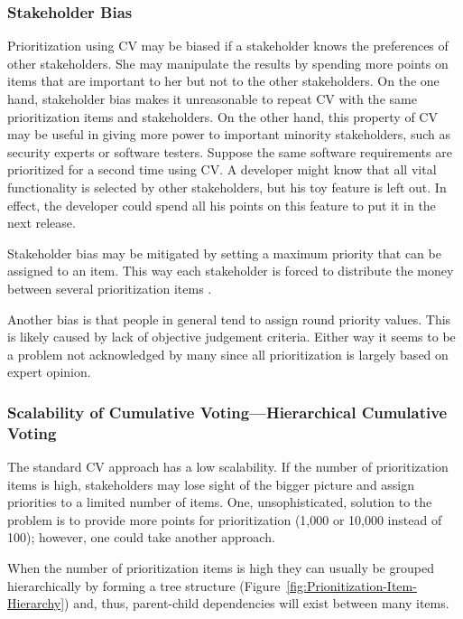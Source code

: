 \subsubsection{Stakeholder Bias\label{sub:Stakeholder-Bias}}

Prioritization using CV may be biased if a stakeholder knows the preferences
of other stakeholders. She may manipulate the results by spending more
points on items that are important to her but not to the other stakeholders.
On the one hand, stakeholder bias makes it unreasonable to repeat CV
with the same prioritization items and stakeholders. On the other hand,
this property of CV may be useful in giving more power to important
minority stakeholders, such as security experts or software testers.
Suppose the same software requirements are prioritized for a second time using
CV. A developer might know that all vital functionality is selected by
other stakeholders, but his toy feature is left out. In effect, the developer
could spend all his points on this feature to put it in the next release. 

Stakeholder bias may be mitigated by setting a maximum priority that
can be assigned to an item. This way each stakeholder is forced to
distribute the money between several prioritization items \cite{Berander2006a}.

Another bias is that people in general tend to assign round priority
values. This is likely caused by lack of objective judgement criteria. Either
way it seems to be a problem not acknowledged by many since all prioritization is largely
based on expert opinion.

\subsubsection{Scalability of Cumulative Voting---Hierarchical Cumulative Voting\label{hcv}}

The standard CV approach has a low scalability. If the number of prioritization items
is high, stakeholders may lose sight of the bigger picture and assign priorities to a
limited number of items. One, unsophisticated, solution to the problem is to provide
more points for prioritization (1,000 or 10,000 instead of 100); however, one could take another approach. 

When the number of prioritization items is high they can usually 
be grouped hierarchically by forming a tree structure (Figure~\ref{fig:Prionitization-Item-Hierarchy}) 
and, thus, parent-child dependencies will exist between many items.

